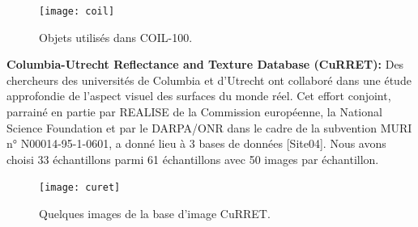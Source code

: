 \begin{figure}[H]
	\centering
	\texttt{[image: coil]} 
	\caption{Objets utilisés dans COIL-100.}
\end{figure}

\textbf{Columbia-Utrecht Reflectance and Texture Database (CuRRET):}
Des chercheurs des universités de Columbia et d'Utrecht ont collaboré dans une étude approfondie de l'aspect visuel des surfaces du monde réel. Cet effort conjoint, parrainé en partie par REALISE de la Commission européenne, la National Science Foundation et par le DARPA/ONR dans le cadre de la subvention MURI n° N00014-95-1-0601, a donné lieu à 3 bases de données [Site04]. Nous avons choisi 33 échantillons parmi 61 échantillons avec 50 images par échantillon.
\begin{figure}[H]
	\centering
	\texttt{[image: curet]} 
	\caption{Quelques images de la base d’image CuRRET.}
\end{figure}

%
%
%

